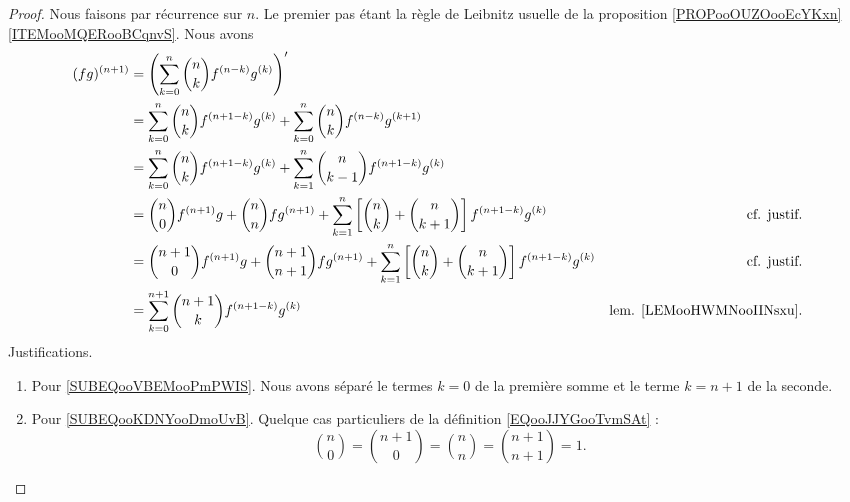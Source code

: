 \begin{proof}
	Nous faisons par récurrence sur \( n\). Le premier pas étant la règle de Leibnitz usuelle de la proposition \ref{PROPooOUZOooEcYKxn}\ref{ITEMooMQERooBCqnvS}. Nous avons
	\begin{subequations}
		\begin{align}
			(fg)^{(n+1)} & =\left( \sum_{k=0}^n\binom{ n }{ k }f^{(n-k)}g^{(k)}  \right)'                                                                                                                                    \\
			             & =\sum_{k=0}^n\binom{ n }{ k }f^{(n+1-k)}g^{(k)}+\sum_{k=0}^n\binom{ n }{ k }f^{(n-k)}g^{(k+1)}                                                                                                    \\
			             & =\sum_{k=0}^n\binom{ n }{ k }f^{(n+1-k)}g^{(k)}+\sum_{k=1}^n\binom{ n }{ k-1 }f^{(n+1-k)}g^{(k)}                                                                                                  \\
			             & =\binom{ n }{ 0 }f^{(n+1)}g+\binom{ n }{ n }fg^{(n+1)}+\sum_{k=1}^{n}\left[  \binom{ n }{ k }+\binom{ n }{ k+1 }  \right]f^{(n+1-k)}g^{(k)}       & \text{cf. justif.}	\label{SUBEQooVBEMooPmPWIS} \\
			             & =\binom{ n+1 }{ 0 }f^{(n+1)}g+\binom{ n+1 }{ n+1 }fg^{(n+1)}+\sum_{k=1}^{n}\left[  \binom{ n }{ k }+\binom{ n }{ k+1 }  \right]f^{(n+1-k)}g^{(k)} & \text{cf. justif.}	\label{SUBEQooKDNYooDmoUvB} \\
			             & =\sum_{k=0}^{n+1}\binom{ n+1 }{ k }f^{(n+1-k)}g^{(k)}                                                                                             & \text{lem. \ref{LEMooHWMNooIINsxu}}.
		\end{align}
	\end{subequations}
	Justifications.
	\begin{enumerate}
		\item
		      Pour \eqref{SUBEQooVBEMooPmPWIS}. Nous avons séparé le termes \( k=0\) de la première somme et le terme \( k=n+1\) de la seconde.
		\item
		      Pour \eqref{SUBEQooKDNYooDmoUvB}. Quelque cas particuliers de la définition \eqref{EQooJJYGooTvmSAt} :
		      \begin{equation}
			      \binom{ n }{ 0 }=\binom{ n+1 }{ 0 }=\binom{ n }{ n }=\binom{ n+1 }{ n+1 }=1.
		      \end{equation}
	\end{enumerate}
\end{proof}

